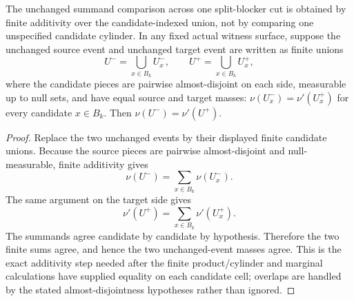 \begin{helper}
The unchanged summand comparison across one split-blocker cut is obtained by
finite additivity over the candidate-indexed union, not by comparing one
unspecified candidate cylinder.  In any fixed actual witness surface, suppose
the unchanged source event and unchanged target event are written as finite
unions
\[
U^-=\bigcup_{x\in B_k} U^-_x,\qquad
U^+=\bigcup_{x\in B_k} U^+_x,
\]
where the candidate pieces are pairwise almost-disjoint on each side,
measurable up to null sets, and have equal source and target masses:
\(\nu(U^-_x)=\nu'(U^+_x)\) for every candidate \(x\in B_k\).  Then
\(\nu(U^-)=\nu'(U^+)\).
\end{helper}
\begin{proof}
Replace the two unchanged events by their displayed finite candidate unions.
Because the source pieces are pairwise almost-disjoint and null-measurable,
finite additivity gives
\[
\nu(U^-)=\sum_{x\in B_k}\nu(U^-_x).
\]
The same argument on the target side gives
\[
\nu'(U^+)=\sum_{x\in B_k}\nu'(U^+_x).
\]
The summands agree candidate by candidate by hypothesis.  Therefore the two
finite sums agree, and hence the two unchanged-event masses agree.  This is
the exact additivity step needed after the finite product/cylinder and
marginal calculations have supplied equality on each candidate cell; overlaps
are handled by the stated almost-disjointness hypotheses rather than ignored.
\end{proof}
